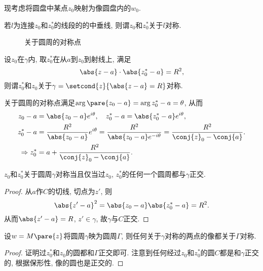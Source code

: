 \documentclass[../ComplexVariable.tex]{subfiles}
\begin{document}
现考虑将圆盘中某点$z_0$映射为像圆盘内的$w_0$.
\begin{definition}
    若$l$为连接$z_0$和$z^*_0$的线段的的中垂线, 则谓$z_0$和$z^*_0$关于$l$对称.
\end{definition}
\begin{figure}[ht]
    \centering
    \caption{关于圆周的对称点}
\end{figure}
\begin{remark}
    设$z_0$在$\gamma$内, 取$z_0^*$在从$a$到$z_0$到射线上, 满足
    \[ \abs{z-a}\cdot \abs{z_0^* - a} = R^2, \]
    则谓$z_0^*$和$z_0$关于$\gamma = \setcond{z}{\abs{z-a} = R}$对称.
\end{remark}
关于圆周的对称点满足$\arg\pare{z_0 - a} = \arg{z_0^* - a} = \theta$, 从而
\begin{align*}
    z_0 - a &= \abs{z_0 - a}e^{i\theta},\quad z_0^* - a = \abs{z_0^* - a}e^{i\theta}, \\
    z_0^* - a &= \frac{R^2}{\abs{z_0 - a}}e^{i\theta} = \frac{R^2}{\abs{z_0 - a}e^{-i\theta}} = \frac{R^2}{\conj{z}_0 - \conj{a}}. \\
    \Rightarrow z_0^* &= a + \frac{R^2}{\conj{z}_0 - \conj{a}}.
\end{align*}
\begin{figure}[ht]
    \centering
\end{figure}
\begin{lemma}
    $z_0$和$z_0^*$关于圆周$\gamma$对称当且仅当过$z_0$, $z_0^*$的任何一个圆周都与$\gamma$正交.
\end{lemma}
\begin{proof}
    从$a$作$C$的切线, 切点为$z'$, 则
    \[ \abs{z'-a}^2 = \abs{z_0 - a}\abs{z_0^* - a} = R^2. \]
    从而$\abs{z'-a} = R$, $z'\in \gamma$, 故$\gamma$与$C$正交.
\end{proof}
\begin{theorem}
    设$w=M\pare{z}$将圆周$\gamma$映为圆周$\Gamma$, 则任何关于$\gamma$对称的两点的像都关于$\Gamma$对称. 
\end{theorem}
\begin{proof}
    证明过$z_0^*$和$z_0$的圆都和$\Gamma$正交即可. 注意到任何经过$z_0$和$z_0^*$的圆$C$都是和$\gamma$正交的, 根据保形性, 像的圆也是正交的.
\end{proof}
\end{document}
